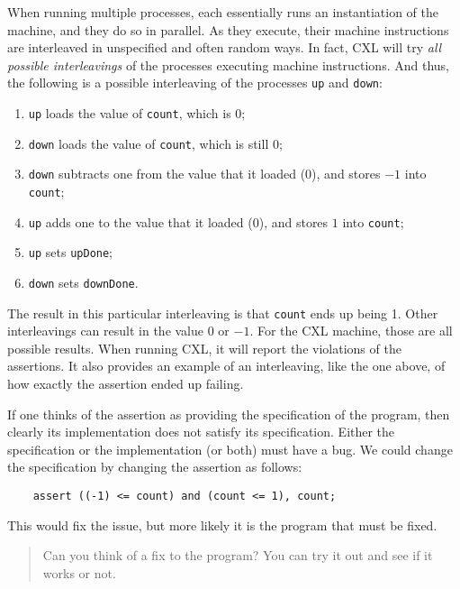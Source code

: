 \documentclass{book}
\newenvironment{code}{
\tcolorbox
}{
\endtcolorbox
}
\begin{document}
When running multiple processes, each essentially runs an instantiation of
the machine, and they do so in parallel.  As they execute, their machine
instructions are interleaved in unspecified and often random ways.
In fact, CXL will try \emph{all possible interleavings} of the processes
executing machine instructions.
And thus, the following is a possible interleaving of
the processes \texttt{up} and \texttt{down}:
\begin{enumerate}
\item \texttt{up} loads the value of \texttt{count}, which is 0;
\item \texttt{down} loads the value of \texttt{count}, which is still 0;
\item \texttt{down} subtracts one from the value that it loaded (0), and
stores $-1$ into \texttt{count};
\item \texttt{up} adds one to the value that it loaded (0), and
stores $1$ into \texttt{count};
\item \texttt{up} sets \texttt{upDone};
\item \texttt{down} sets \texttt{downDone}.
\end{enumerate}

The result in this particular interleaving is that \texttt{count} ends up
being 1.  Other interleavings can result in the value 0 or $-1$.  For the
CXL machine, those are all possible results.  When running CXL, it will
report the violations of the assertions.  It also provides an example
of an interleaving, like the one above, of how exactly the assertion
ended up failing.

If one thinks of the assertion as providing the specification of the
program, then clearly its implementation does not satisfy its specification.
Either the specification or the implementation (or both) must have a bug.
We could change the specification by changing the assertion as follows:

\begin{code}
\begin{verbatim}
    assert ((-1) <= count) and (count <= 1), count;
\end{verbatim}
\end{code}

This would fix the issue, but more likely it is the program that must
be fixed.

\begin{quote}
Can you think of a fix to the program?  You can try it out and see
if it works or not.
\end{quote}
\end{document}
